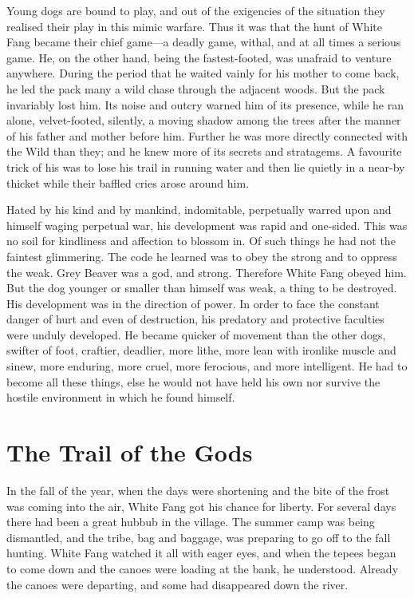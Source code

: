\documentclass[10pt]{book}
\begin{document}
Young dogs are bound to play, and out of the exigencies of the
situation they realised their play in this mimic warfare. Thus it was
that the hunt of White Fang became their chief game—a deadly game,
withal, and at all times a serious game. He, on the other hand, being
the fastest-footed, was unafraid to venture anywhere. During the period
that he waited vainly for his mother to come back, he led the pack many
a wild chase through the adjacent woods. But the pack invariably lost
him. Its noise and outcry warned him of its presence, while he ran
alone, velvet-footed, silently, a moving shadow among the trees after
the manner of his father and mother before him. Further he was more
directly connected with the Wild than they; and he knew more of its
secrets and stratagems. A favourite trick of his was to lose his trail
in running water and then lie quietly in a near-by thicket while their
baffled cries arose around him.

Hated by his kind and by mankind, indomitable, perpetually warred upon
and himself waging perpetual war, his development was rapid and
one-sided. This was no soil for kindliness and affection to blossom in.
Of such things he had not the faintest glimmering. The code he learned
was to obey the strong and to oppress the weak. Grey Beaver was a god,
and strong. Therefore White Fang obeyed him. But the dog younger or
smaller than himself was weak, a thing to be destroyed. His development
was in the direction of power. In order to face the constant danger of
hurt and even of destruction, his predatory and protective faculties
were unduly developed. He became quicker of movement than the other
dogs, swifter of foot, craftier, deadlier, more lithe, more lean with
ironlike muscle and sinew, more enduring, more cruel, more ferocious,
and more intelligent. He had to become all these things, else he would
not have held his own nor survive the hostile environment in which he
found himself.

\chapter{The Trail of the Gods}

In the fall of the year, when the days were shortening and the bite of
the frost was coming into the air, White Fang got his chance for
liberty. For several days there had been a great hubbub in the village.
The summer camp was being dismantled, and the tribe, bag and baggage,
was preparing to go off to the fall hunting. White Fang watched it all
with eager eyes, and when the tepees began to come down and the canoes
were loading at the bank, he understood. Already the canoes were
departing, and some had disappeared down the river.
\end{document}
